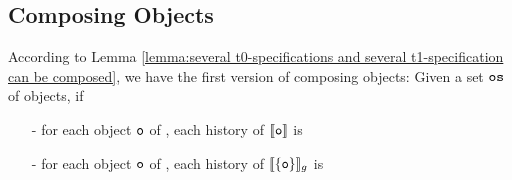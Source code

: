 




\subsection{Composing Objects}
\label{lemma:composing objects}


According to Lemma \ref{lemma:several t0-specifications and several t1-specification can be composed}, we have the first version of composing objects: Given a set $\mathtt{os}$ of objects, if

\begin{itemize}
\setlength{\itemsep}{0.5pt}
\item[-] for each object $\mathtt{o}$ of \tzerolin{}, each history of $\llbracket \mathtt{o} \rrbracket$ is \tzerolinearizable{}
\item[-] for each object $\mathtt{o}$ of \tonelin{}, each history of $\llbracket \{ \mathtt{o} \} \rrbracket_g$ is \tonelinearizable{}
\end{itemize}

